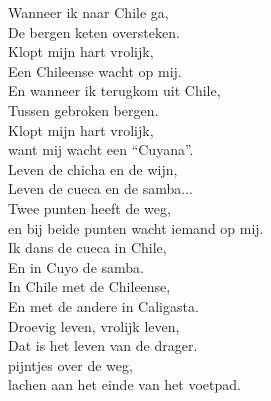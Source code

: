 \clearpage
\begin{translation}
Wanneer ik naar Chile ga,\\
De bergen keten oversteken.\\
Klopt mijn hart vrolijk,\\
Een Chileense wacht op mij.\\
En wanneer ik terugkom uit Chile,\\
Tussen gebroken bergen.\\
Klopt mijn hart vrolijk,\\
want mij wacht een “Cuyana”.\\
Leven de chicha en de wijn,\\
Leven de cueca en de samba...\\
Twee punten heeft de weg,\\
en bij beide punten wacht iemand op mij.\\
Ik dans de cueca in Chile,\\
En in Cuyo de samba.\\
In Chile met de Chileense,\\
En met de andere in Caligasta.\\
Droevig leven, vrolijk leven,\\
Dat is het leven van de drager.\\
pijntjes over de weg,\\
lachen aan het einde van het voetpad.
\end{translation}